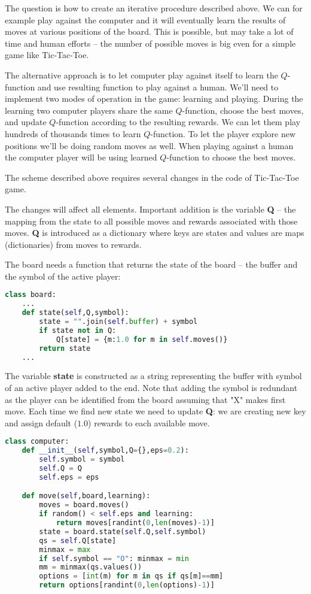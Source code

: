 The question is how to create an iterative procedure described above.
We can for example play against the computer and it will eventually
learn the results of moves at various positions of the board. This
is possible, but may take a lot of time and human efforts -- the number of
possible moves is big even for a simple game like Tic-Tac-Toe.

The alternative approach is to let computer play against itself
to learn the $Q$-function and use resulting function to play against
a human. We'll need to implement two modes of operation in the game:
learning and playing. During the learning two computer players
share the same $Q$-function, choose the best moves, and update
$Q$-function according to the resulting rewards. We can let them
play hundreds of thousands times to learn $Q$-function. To let
the player explore new positions we'll be doing random moves as well.
When playing against a human the computer player will be using
learned $Q$-function to choose the best moves.

The scheme described above requires several changes in the code
of Tic-Tac-Toe game.

The changes will affect all elements. Important addition is the variable
\textbf{Q} -- the mapping from the state to all possible moves and rewards
associated with those moves. \textbf{Q} is introduced as a dictionary where
keys are states and values are maps (dictionaries) from moves to rewards.

The board needs a function that returns the state of the board --
the buffer and the symbol of the active player:

\begin{lstlisting}[language=Python,style=codelst2,caption={Tic-Tac-Toe: Q-learning, board}]
class board:
    ...
    def state(self,Q,symbol):
        state = "".join(self.buffer) + symbol
        if state not in Q:
            Q[state] = {m:1.0 for m in self.moves()}
        return state
    ...
\end{lstlisting}
The variable \textbf{state} is constructed as a string representing the buffer
with symbol of an active player added to the end.
Note that adding the symbol is redundant
as the player can be identified from the board assuming that "X" makes first move.
Each time we find new state we need to update \textbf{Q}: we are creating
new key and assign default ($1.0$) rewards to each available move.

\begin{lstlisting}[language=Python,style=codelst2,caption={Tic-Tac-Toe: Q-learning, computer player}]
class computer:
    def __init__(self,symbol,Q={},eps=0.2):
        self.symbol = symbol
        self.Q = Q
        self.eps = eps

    def move(self,board,learning):
        moves = board.moves()
        if random() < self.eps and learning:
            return moves[randint(0,len(moves)-1)]
        state = board.state(self.Q,self.symbol)
        qs = self.Q[state]
        minmax = max
        if self.symbol == "O": minmax = min
        mm = minmax(qs.values())
        options = [int(m) for m in qs if qs[m]==mm]
        return options[randint(0,len(options)-1)]
\end{lstlisting}

